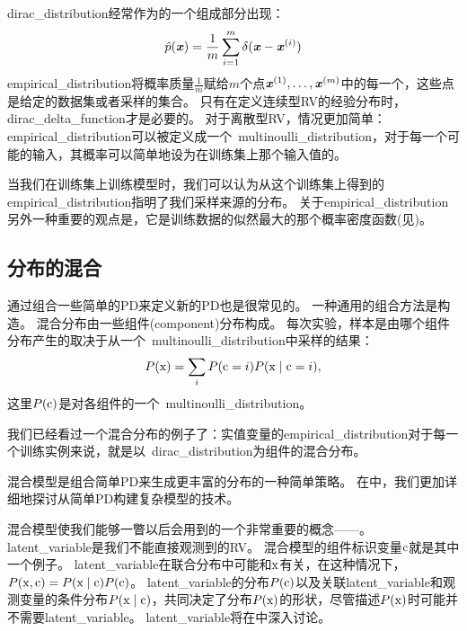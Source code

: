 \gls{dirac_distribution}经常作为的一个组成部分出现：
\begin{equation}
\hat{p}(\boldsymbol{\mathit{x}}) = \frac{1}{m} \sum_{i=1}^m \delta(\boldsymbol{\mathit{x}} - \boldsymbol{\mathit{x}}^{(i)})
\end{equation}
\gls{empirical_distribution}将概率质量$\frac{1}{m}$赋给$m$个点$\boldsymbol{\mathit{x}}^{(1)}, \ldots, \boldsymbol{\mathit{x}}^{(m)}$中的每一个，这些点是给定的数据集或者采样的集合。
只有在定义连续型\gls{RV}的经验分布时，\gls{dirac_delta_function}才是必要的。
对于离散型\gls{RV}，情况更加简单：\gls{empirical_distribution}可以被定义成一个~\gls{multinoulli_distribution}，对于每一个可能的输入，其概率可以简单地设为在训练集上那个输入值的。

当我们在训练集上训练模型时，我们可以认为从这个训练集上得到的\gls{empirical_distribution}指明了我们采样来源的分布。
关于\gls{empirical_distribution}另外一种重要的观点是，它是训练数据的似然最大的那个概率密度函数(见)。

\subsection{分布的混合}
\label{sec:mixtures_of_distributions}

通过组合一些简单的\gls{PD}来定义新的\gls{PD}也是很常见的。
一种通用的组合方法是构造。
混合分布由一些组件(component)分布构成。
每次实验，样本是由哪个组件分布产生的取决于从一个~\gls{multinoulli_distribution}中采样的结果：
\begin{equation}
P(\mathrm{x}) = \sum_i P(\mathrm{c} = i) P(\mathrm{x} \mid \mathrm{c} = i),
\end{equation}
这里$P(\mathrm{c})$是对各组件的一个~\gls{multinoulli_distribution}。

我们已经看过一个混合分布的例子了：实值变量的\gls{empirical_distribution}对于每一个训练实例来说，就是以~\gls{dirac_distribution}为组件的混合分布。


混合模型是组合简单\gls{PD}来生成更丰富的分布的一种简单策略。
在中，我们更加详细地探讨从简单\gls{PD}构建复杂模型的技术。

混合模型使我们能够一瞥以后会用到的一个非常重要的概念——。
\gls{latent_variable}是我们不能直接观测到的\gls{RV}。
混合模型的组件标识变量$\mathrm{c}$就是其中一个例子。
\gls{latent_variable}在联合分布中可能和$\mathrm{x}$有关，在这种情况下，$P(\mathrm{x}, \mathrm{c}) = P(\mathrm{x} \mid \mathrm{c})P(\mathrm{c})$。
\gls{latent_variable}的分布$P(\mathrm{c})$以及关联\gls{latent_variable}和观测变量的条件分布$P(\mathrm{x} \mid\mathrm{c})$，共同决定了分布$P(\mathrm{x})$的形状，尽管描述$P(\mathrm{x})$时可能并不需要\gls{latent_variable}。
\gls{latent_variable}将在中深入讨论。

